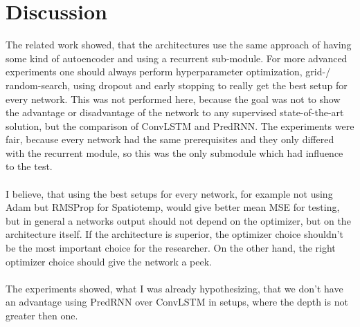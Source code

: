 \section{Discussion} \label{section::discussion}
 The related work showed, that the architectures use the same approach of having some kind of autoencoder and using a recurrent sub-module. %
 For more advanced experiments one should always perform hyperparameter optimization, grid-/ random-search, using dropout and early stopping to really get the
 best setup for every network. This was not performed here, because the goal was not to show the advantage or disadvantage of the network to any supervised
 state-of-the-art solution, but the comparison of ConvLSTM and PredRNN. The experiments were fair, because every network had the same prerequisites and they only
 differed with the recurrent module, so this was the only submodule which had influence to the test.\\\\
 I believe, that using the best setups for every network, for example not using Adam but RMSProp for Spatiotemp, would give better mean MSE for testing, but
 in general a networks output should not depend on the optimizer, but on the architecture itself. If the architecture is superior, the optimizer choice shouldn't
 be the most important choice for the researcher. On the other hand, the right optimizer choice should give the network a peek.\\\\
 The experiments showed, what I was already hypothesizing, that we don't have an advantage using PredRNN over ConvLSTM in setups, where the depth is not greater then
 one.\\\\
